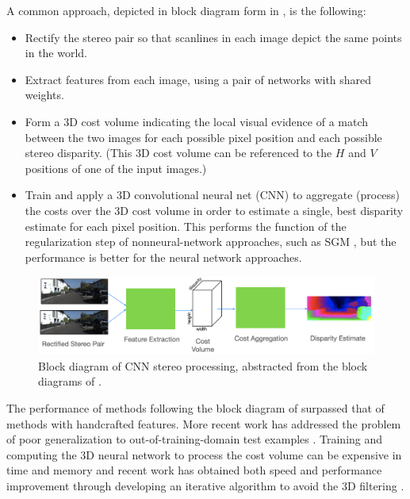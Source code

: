 A common approach, depicted in block diagram form in \fig{\ref{fig:stereoblock}}, is the following:
\begin{itemize}
    \item Rectify the stereo pair so that scanlines in each image depict the same points in the world.
    \item Extract features from each image, using a pair of networks with shared weights.
    \item Form a 3D cost volume indicating the local visual evidence of a match between the two images for each possible pixel position and each possible stereo disparity.  (This 3D cost volume can be referenced to the $H$ and $V$ positions of one of the input images.)
    \item Train and apply a 3D convolutional neural net (CNN) to aggregate (process) the costs over the 3D cost volume in order to estimate a single, best disparity estimate for each pixel position.  This performs the function of the regularization step of nonneural-network approaches, such as SGM \cite{Hirschmuller2007}, but the performance is better for the neural network approaches.
\end{itemize}


\begin{figure}[t]
    \centerline{
        \includegraphics[width=1\linewidth]{figures/stereo/stereocnn.jpg}
    }
    \caption{Block diagram of CNN stereo processing, abstracted from the block diagrams of \cite{Chang2018,Zhang2019GANet,Kendall2017}.}
    \label{fig:stereoblock}
\end{figure}

The performance of methods following the block diagram of \fig{\ref{fig:stereoblock}} surpassed that of methods with handcrafted features.  More recent work has addressed the problem of poor generalization to out-of-training-domain test examples \cite{zhang2019domaininvariant}.  Training and computing the 3D neural network to process the cost volume can be expensive in time and memory and recent work has obtained both speed and performance improvement through developing an iterative algorithm to avoid the 3D filtering \cite{Lipson2021}.


